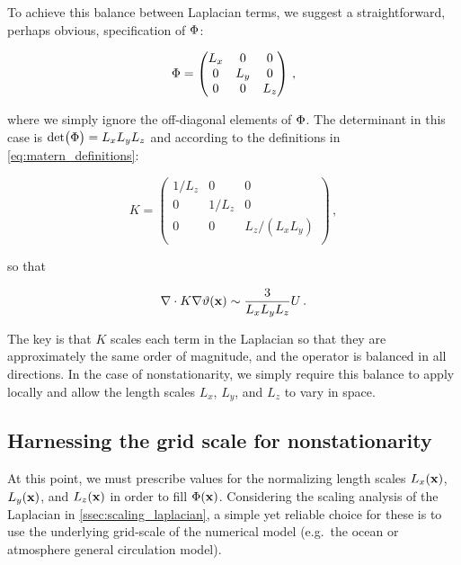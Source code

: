 To achieve this balance between Laplacian terms, we suggest a straightforward,
perhaps obvious, specification of $\Phi$:
\begin{linenomath*}\begin{equation*}
    \Phi =
        \begin{pmatrix}
            L_x & 0 & 0     \\
            0 & L_y & 0     \\
            0 & 0   & L_z   \\
        \end{pmatrix} \, ,
\end{equation*}\end{linenomath*}
where we simply ignore the off-diagonal elements of $\Phi$.
The determinant in this case is $\text{det}\big(\Phi\big) = L_xL_yL_z$ and
according to the definitions in \cref{eq:matern_definitions}:
\begin{linenomath*}\begin{equation*}
    K =
        \begin{pmatrix}
            1/L_z & 0 & 0     \\
            0 & 1/L_z & 0     \\
            0 & 0   & L_z/(L_xL_y)   \\
        \end{pmatrix} \, ,
\end{equation*}\end{linenomath*}
so that
\begin{linenomath*}\begin{equation*}
    \nabla\cdot K\nabla\vartheta(\mathbf{x}) \sim \dfrac{3}{L_xL_yL_z}U \, .
\end{equation*}\end{linenomath*}
The key is that $K$ scales each term in the Laplacian so that they are
approximately the same order of magnitude, and the operator is balanced in all
directions.
In the case of nonstationarity, we simply require this balance to apply locally
and allow the length scales $L_x$, $L_y$, and $L_z$ to vary in space.


\subsection{Harnessing the grid scale for nonstationarity}
\label{ssec:nonstationarity}

At this point, we must prescribe values for the normalizing length scales
$L_x(\mathbf{x})$, $L_y(\mathbf{x})$, and $L_z(\mathbf{x})$ in order to fill $\Phi(\mathbf{x})$.
Considering the scaling analysis of the Laplacian in
\cref{ssec:scaling_laplacian}, a simple yet reliable choice for these
is to use the underlying grid-scale of the numerical model (e.g.\ the ocean or
atmosphere general circulation model).

